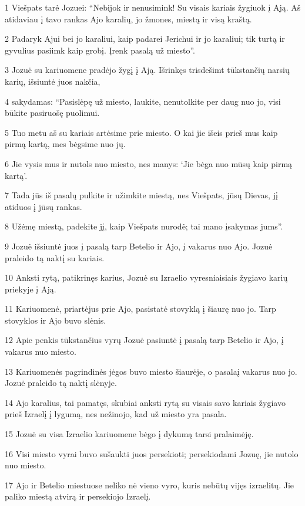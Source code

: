 \par 1 Viešpats tarė Jozuei: “Nebijok ir nenusimink! Su visais kariais žygiuok į Ają. Aš atidaviau į tavo rankas Ajo karalių, jo žmones, miestą ir visą kraštą. 
\par 2 Padaryk Ajui bei jo karaliui, kaip padarei Jerichui ir jo karaliui; tik turtą ir gyvulius pasiimk kaip grobį. Įrenk pasalą už miesto”. 
\par 3 Jozuė su kariuomene pradėjo žygį į Ają. Išrinkęs trisdešimt tūkstančių narsių karių, išsiuntė juos nakčia, 
\par 4 sakydamas: “Pasislėpę už miesto, laukite, nenutolkite per daug nuo jo, visi būkite pasiruošę puolimui. 
\par 5 Tuo metu aš su kariais artėsime prie miesto. O kai jie išeis prieš mus kaip pirmą kartą, mes bėgsime nuo jų. 
\par 6 Jie vysis mus ir nutols nuo miesto, nes manys: ‘Jie bėga nuo mūsų kaip pirmą kartą’. 
\par 7 Tada jūs iš pasalų pulkite ir užimkite miestą, nes Viešpats, jūsų Dievas, jį atiduos į jūsų rankas. 
\par 8 Užėmę miestą, padekite jį, kaip Viešpats nurodė; tai mano įsakymas jums”. 
\par 9 Jozuė išsiuntė juos į pasalą tarp Betelio ir Ajo, į vakarus nuo Ajo. Jozuė praleido tą naktį su kariais. 
\par 10 Anksti rytą, patikrinęs karius, Jozuė su Izraelio vyresniaisiais žygiavo karių priekyje į Ają. 
\par 11 Kariuomenė, priartėjus prie Ajo, pasistatė stovyklą į šiaurę nuo jo. Tarp stovyklos ir Ajo buvo slėnis. 
\par 12 Apie penkis tūkstančius vyrų Jozuė pasiuntė į pasalą tarp Betelio ir Ajo, į vakarus nuo miesto. 
\par 13 Kariuomenės pagrindinės jėgos buvo miesto šiaurėje, o pasala­į vakarus nuo jo. Jozuė praleido tą naktį slėnyje. 
\par 14 Ajo karalius, tai pamatęs, skubiai anksti rytą su visais savo kariais žygiavo prieš Izraelį į lygumą, nes nežinojo, kad už miesto yra pasala. 
\par 15 Jozuė su visa Izraelio kariuomene bėgo į dykumą tarsi pralaimėję. 
\par 16 Visi miesto vyrai buvo sušaukti juos persekioti; persekiodami Jozuę, jie nutolo nuo miesto. 
\par 17 Ajo ir Betelio miestuose neliko nė vieno vyro, kuris nebūtų vijęs izraelitų. Jie paliko miestą atvirą ir persekiojo Izraelį. 

